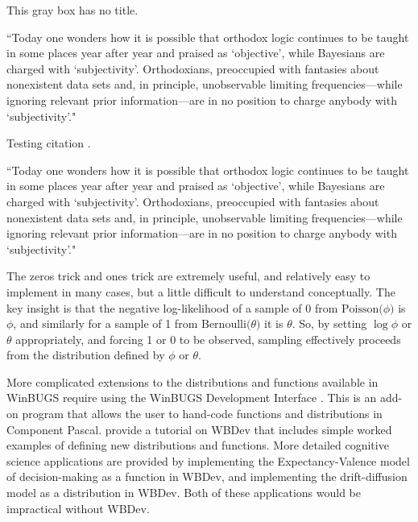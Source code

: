 \documentclass{bayeshyp}
\begin{document}
\begin{graybg}[][h]
  This gray box has no title. \lipsum[2]
\end{graybg}

\begin{graybg}
  ``Today one wonders how it is possible that orthodox logic continues to be
  taught in some places year after year and praised as `objective', while
  Bayesians are charged with `subjectivity'. Orthodoxians, preoccupied with
  fantasies about nonexistent data sets and, in principle, unobservable
  limiting frequencies---while ignoring relevant prior information---are in no
  position to charge anybody with `subjectivity'."\cite{Jaynes2003}
\end{graybg}

Testing citation \cite{Jaynes2003}.

\lipsum

\begin{graybg*}
  ``Today one wonders how it is possible that orthodox logic continues to be
  taught in some places year after year and praised as `objective', while
  Bayesians are charged with `subjectivity'. Orthodoxians, preoccupied with
  fantasies about nonexistent data sets and, in principle, unobservable
  limiting frequencies---while ignoring relevant prior information---are in no
  position to charge anybody with `subjectivity'."\cite{Jaynes2003}
\end{graybg*}

\begin{graybg}
  The zeros trick and ones trick are extremely useful, and relatively easy to
  implement in many cases, but a little difficult to understand conceptually.
  The key insight is that the negative log-likelihood of a sample of 0 from
  $\mathrm{Poisson}\bigl(\phi\bigr)$ is $\phi$, and similarly for a sample of 1
  from $\mathrm{Bernoulli}\bigl(\theta\bigr)$ it is $\theta$. So, by setting
  $\log \phi$ or $\theta$ appropriately, and forcing 1 or 0 to be observed,
  sampling effectively proceeds from the distribution defined by $\phi$ or
  $\theta$.

  More complicated extensions to the distributions and functions available in
  WinBUGS require using the WinBUGS Development Interface
  \cite{Lunn2003}. This is an add-on program that allows the user to
  hand-code functions and distributions in Component Pascal.
  \cite{Abelson1997} provide a tutorial on WBDev that includes
  simple worked examples of defining new distributions and functions. More
  detailed cognitive science applications are provided by
  \cite{AczelEtAl2017} implementing the Expectancy-Valence model of
  decision-making as a function in WBDev, and \cite{VandekerckhoveEtAl2011}
  implementing the drift-diffusion model as a distribution in WBDev. Both of
  these applications would be impractical without WBDev.
\end{graybg}
\end{document}
